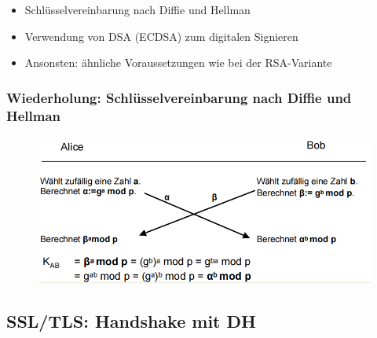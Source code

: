 \documentclass[openany]{book}
\begin{document}
\begin{itemize}
    \item Schlüsselvereinbarung nach Diffie und Hellman
    \item Verwendung von DSA (ECDSA) zum digitalen Signieren
    \item Ansonsten: ähnliche Voraussetzungen wie bei der RSA-Variante 
\end{itemize}

\newpage

\subsubsection{Wiederholung: Schlüsselvereinbarung nach Diffie und Hellman}

\begin{figure}[h!]
    \centering
    \includegraphics[width=\linewidth]{Pics/DiffieHellmanAgain.PNG}
\end{figure}

\subsection{SSL/TLS: Handshake mit DH}
\end{document}
